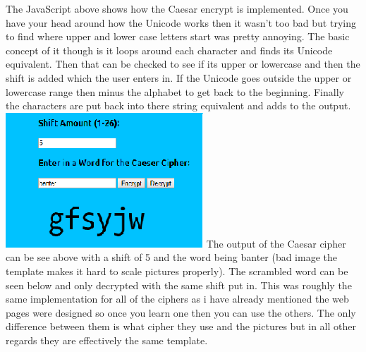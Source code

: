 \documentclass[10pt, a4paper]{article}
\begin{document}
The JavaScript above shows how the Caesar encrypt is implemented. Once you have your head around how the Unicode works then it wasn't too bad but trying to find where upper and lower case letters start was pretty annoying. The basic concept of it though is it loops around each character and finds its Unicode equivalent. Then that can be checked to see if its upper or lowercase and then the shift is added which the user enters in. If the Unicode goes outside the upper or lowercase range then minus the alphabet to get back to the beginning. Finally the characters are put back into there string equivalent and adds to the output.
\includegraphics{images/Caesar.PNG}
The output of the Caesar cipher can be see above with a shift of 5 and the word being banter (bad image the template makes it hard to scale pictures properly). The scrambled word can be seen below and only decrypted with the same shift put in. This was roughly the same implementation for all of the ciphers as i have already mentioned the web pages were designed so once you learn one then you can use the others. The only difference between them is what cipher they use and the pictures but in all other regards they are effectively the same template. 
\end{document}
